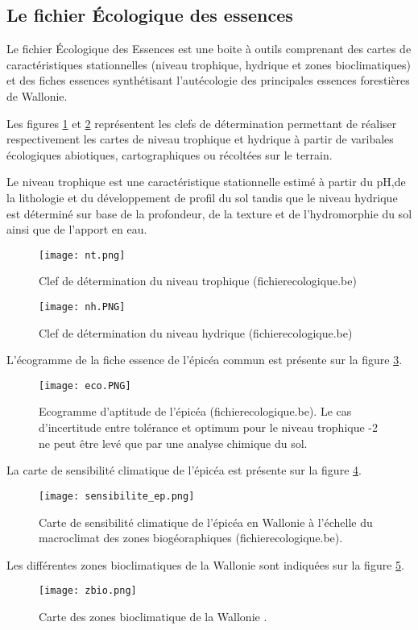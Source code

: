 \subsection{Le fichier Écologique des essences }


Le fichier Écologique des Essences est une boite à outils comprenant des cartes de caractéristiques stationnelles (niveau trophique, hydrique et zones bioclimatiques) et des fiches essences synthétisant l'autécologie des principales essences forestières de Wallonie.

Les figures \ref{fig:nt} et \ref{fig:nh} représentent les clefs de détermination permettant de réaliser respectivement les cartes de niveau trophique et hydrique à partir de varibales écologiques abiotiques, cartographiques ou récoltées sur le terrain.

Le niveau trophique est une caractéristique stationnelle estimé à partir du pH,de la lithologie et du développement de profil du sol tandis que le niveau hydrique est déterminé sur base de la profondeur, de la texture et  de l'hydromorphie du sol ainsi que  de l'apport en eau.

\begin{figure} [htbp] 
    \centering
    \texttt{[image: nt.png]}
    \caption{Clef de détermination du niveau trophique (fichierecologique.be)}
    \label{fig:nt}
\end{figure}
 
\begin{figure} [htbp] 
    \centering
    \texttt{[image: nh.PNG]}
    \caption{Clef de détermination du niveau hydrique (fichierecologique.be) }
    \label{fig:nh}
\end{figure}


L'écogramme de la fiche essence de l'épicéa commun est présente sur la figure \ref{fig:eco}.
\begin{figure} [htbp] 
    \centering
    \texttt{[image: eco.PNG]}
    \caption{Ecogramme d'aptitude de l'épicéa (fichierecologique.be). Le cas d'incertitude entre tolérance et optimum pour le niveau trophique -2 ne peut être levé que par une analyse chimique du sol. }
    \label{fig:eco}
\end{figure}

La carte de sensibilité climatique de l'épicéa est présente sur la figure \ref{fig:sens}.
\begin{figure} [htbp] 
    \centering
    \texttt{[image: sensibilite\_ep.png]}
    \caption{Carte de sensibilité climatique de l'épicéa en Wallonie à l'échelle du macroclimat des zones biogéoraphiques (fichierecologique.be).}
    \label{fig:sens}
\end{figure}
Les différentes zones bioclimatiques de la Wallonie sont indiquées sur la figure \ref{fig:zbio}.
\begin{figure} [htbp] 
    \centering
    \texttt{[image: zbio.png]}
    \caption{Carte des zones bioclimatique de la Wallonie \citep{van_der_perre_carte_2015}.}
    \label{fig:zbio}
\end{figure}


